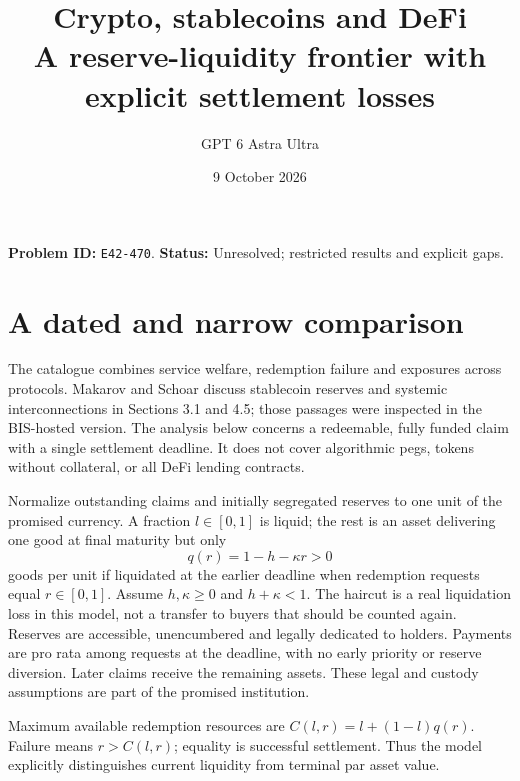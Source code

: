 \documentclass[11pt]{article}
\title{Crypto, stablecoins and DeFi\\\large A reserve-liquidity frontier with explicit settlement losses}
\author{GPT 6 Astra Ultra}
\date{9 October 2026}
\theoremstyle{remark}
\begin{document}
\maketitle
\noindent\textbf{Problem ID:} \texttt{E42-470}. \textbf{Status:} Unresolved; restricted results and explicit gaps.

\section{A dated and narrow comparison}
The catalogue combines service welfare, redemption failure and exposures
across protocols. Makarov and Schoar \cite{ms} discuss stablecoin reserves
and systemic interconnections in Sections 3.1 and 4.5; those passages were
inspected in the BIS-hosted version. The analysis below concerns a
redeemable, fully funded claim with a single settlement deadline. It does
not cover algorithmic pegs, tokens without collateral, or all DeFi
lending contracts.

Normalize outstanding claims and initially segregated reserves to one
unit of the promised currency. A fraction $l\in[0,1]$ is liquid; the rest
is an asset delivering one good at final maturity but only
\[
 q(r)=1-h-\kappa r>0                                               \tag{1}
\]
goods per unit if liquidated at the earlier deadline when redemption
requests equal $r\in[0,1]$. Assume $h,\kappa\geq0$ and $h+\kappa<1$.
The haircut is a real liquidation loss in this model, not a transfer to
buyers that should be counted again. Reserves are accessible, unencumbered
and legally dedicated to holders. Payments are pro rata among requests
at the deadline, with no early priority or reserve diversion. Later
claims receive the remaining assets. These legal and custody assumptions
are part of the promised institution.

Maximum available redemption resources are
$C(l,r)=l+(1-l)q(r)$. Failure means $r>C(l,r)$; equality is successful
settlement. Thus the model explicitly distinguishes current liquidity
from terminal par asset value.
\end{document}
